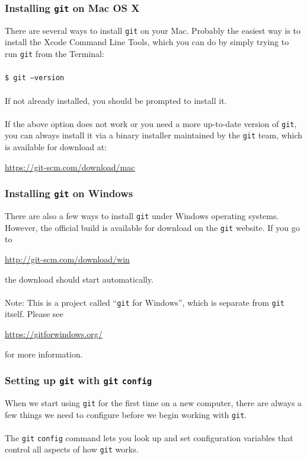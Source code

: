 \documentclass{beamer}
\begin{document}
\begin{frame}
   \frametitle{Installing \texttt{git} on Mac OS X}
   There are several ways to install \texttt{git} on your Mac. Probably 
   the easiest way is to install the Xcode Command Line Tools, which you 
   can do by simply trying to run \texttt{git} from the Terminal:
   \\ \ \\
   \hspace{1.0em}\texttt{\$ git --version}
   \\ \ \\
   If not already installed, you should be prompted to install it. 
   \\ \ \\
   If the above option does not work or you need a more up-to-date 
   version of \texttt{git}, you can always install it via a binary 
   installer maintained by the \texttt{git} team, which is available for
   download at: \\
   \begin{center}
      \url{https://git-scm.com/download/mac}
   \end{center}
\end{frame}

\begin{frame}
   \frametitle{Installing \texttt{git} on Windows}
   There are also a few ways to install \texttt{git} under Windows 
   operating systems. However, the official build is available for 
   download on the \texttt{git} website. If you go to \\
   \begin{center}
      \url{http://git-scm.com/download/win}
   \end{center}
   the download should start automatically.
   \\ \ \\
   Note: This is a project called ``\texttt{git} for Windows'', which is
   separate from \texttt{git} itself. Please see \\
   \begin{center}
      \url{https://gitforwindows.org/}
   \end{center}
    for more information.
\end{frame}

\begin{frame}
   \frametitle{Setting up \texttt{git} with \texttt{git} \texttt{config}}
   When we start using \texttt{git} for the first time on a new 
   computer, there are always a few things we need to configure
   before we begin working with \texttt{git}. 
   \\ \ \\
   The \texttt{git} \texttt{config} command lets you look up and set 
   configuration variables that control all aspects of how \texttt{git} 
   works.
\end{frame}
\end{document}
